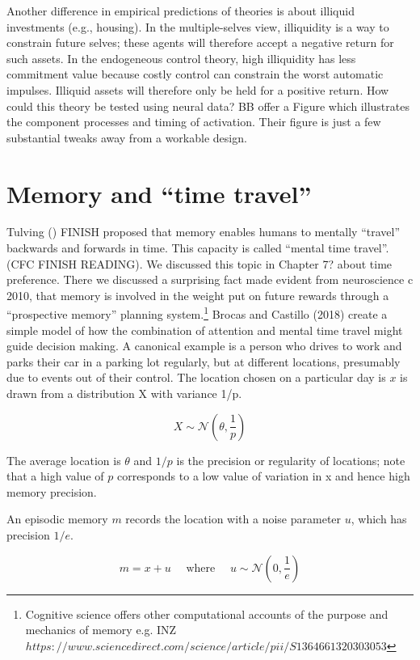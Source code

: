 \documentclass{article}
\begin{document}
Another difference in empirical predictions of theories is about illiquid investments (e.g., housing). In the multiple-selves view, illiquidity is a way to constrain future selves; these agents will therefore accept a negative return for such assets. In the endogeneous control theory, high illiquidity has less commitment value because costly control can constrain the worst automatic impulses. Illiquid assets will therefore only be held for a positive return. How could this theory be tested using neural data? BB offer a Figure which illustrates the component processes and timing of activation. Their figure is just a few substantial tweaks away from a workable design.

\section{Memory and “time travel”}
Tulving () FINISH proposed that memory enables humans to mentally “travel” backwards and forwards in time. This capacity is called “mental time travel”. (CFC FINISH READING).  We discussed this topic in Chapter 7? about time preference. There we discussed a surprising fact made evident from neuroscience c 2010,  that memory is involved in the weight put on future rewards through a “prospective memory” planning system.\footnote{Cognitive science offers other computational accounts of the purpose and mechanics of memory e.g. INZ $https://www.sciencedirect.com/science/article/pii/S1364661320303053$}
Brocas and Castillo (2018) create a simple model of how the combination of attention and mental time travel might guide decision making. A canonical example is a person who drives to work and parks their car in a parking lot regularly, but at different locations, presumably due to events out of their control.  The location chosen on a particular day is $x$ is drawn from a distribution X with variance 1/p. 

$$
X \sim \mathcal{N}\left(\theta, \frac{1}{p}\right)
$$

The average location is $\theta$ and $1/p$ is the precision or regularity of locations; note that a high value of $p$ corresponds to a low value of variation in x and hence high memory precision. 

An episodic memory $m$ records the location with a noise parameter $u$, which has precision $1/e$. 

$$
m=x+u \quad \text { where } \quad u \sim \mathcal{N}\left(0, \frac{1}{e}\right)
$$
\end{document}
